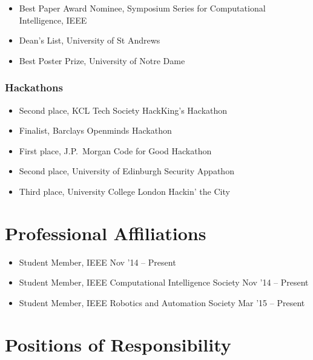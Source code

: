 \documentclass[line,margin]{cv}
\begin{document}
\begin{resume}
\begin{itemize}
    \item Best Paper Award Nominee, Symposium Series for Computational
        Intelligence, IEEE
    \item Dean's List, University of St Andrews
    \item Best Poster Prize, University of Notre Dame

\end{itemize}

\subsubsection{Hackathons}

\begin{itemize}

    \item Second place, KCL Tech Society HackKing's Hackathon
    \item Finalist, Barclays Openminds Hackathon
    \item First place, J.P.\ Morgan Code for Good Hackathon
    \item Second place, University of Edinburgh Security Appathon
    \item Third place, University College London Hackin' the City

\end{itemize}

\section{Professional Affiliations}

\begin{itemize}

    \item Student Member, IEEE \hfill Nov '14 -- Present
    \item Student Member, IEEE Computational Intelligence Society
        \hfill Nov '14 -- Present
    \item Student Member, IEEE Robotics and Automation Society
        \hfill Mar '15 -- Present

\end{itemize}

\section{Positions of Responsibility}

\begin{itemize}


\end{itemize}
\end{resume}
\end{document}
